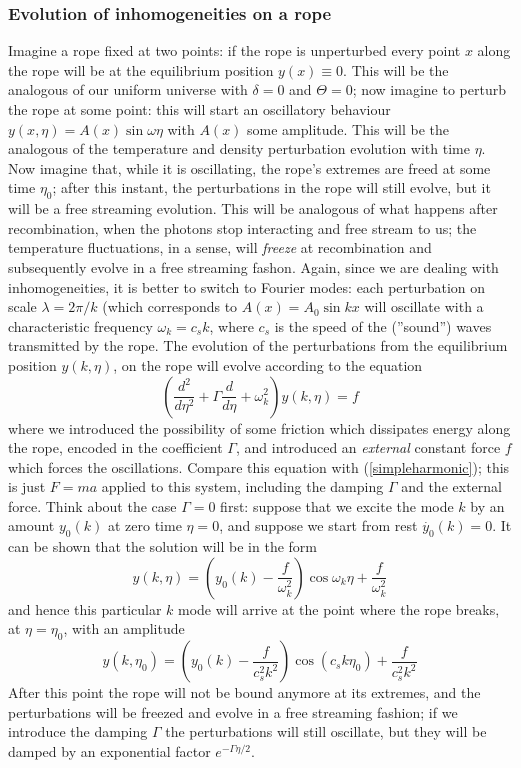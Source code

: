 \subsubsection{Evolution of inhomogeneities on a rope}
Imagine a rope fixed at two points: if the rope is unperturbed every point $x$ along the rope will be at the equilibrium position $y(x)\equiv0$. This will be the analogous of our uniform universe with $\delta=0$ and $\Theta=0$; now imagine to perturb the rope at some point: this will start an oscillatory behaviour $y(x,\eta)=A(x)\sin{\omega \eta}$ with $A(x)$ some amplitude. This will be the analogous of the temperature and density perturbation evolution with time $\eta$. Now imagine that, while it is oscillating, the rope's extremes are freed at some time $\eta_0$; after this instant, the perturbations in the rope will still evolve, but it will be a free streaming evolution. This will be analogous of what happens after recombination, when the photons stop interacting and free stream to us; the temperature fluctuations, in a sense, will \textit{freeze} at recombination and subsequently evolve in a free streaming fashon. Again, since we are dealing with inhomogeneities, it is better to switch to Fourier modes:
 each perturbation on scale $\lambda=2\pi/k$ (which corresponds to $A(x)=A_0\sin{kx}$ will oscillate with a characteristic frequency $\omega_k=c_s k$, where $c_s$ is the speed of the (''sound'') waves transmitted by the rope. The evolution of the perturbations from the equilibrium position $y(k,\eta)$, on the rope will evolve according to the equation
\begin{equation}
\label{ropewaveeq}
\left(\frac{d^2}{d\eta^2}+\Gamma \frac{d}{d\eta}+\omega_k^2\right)y(k,\eta)=f
\end{equation}
where we introduced the possibility of some friction which dissipates energy along the rope, encoded in the coefficient $\Gamma$, and introduced an \textit{external} constant force $f$ which forces the oscillations. Compare this equation with (\ref{simpleharmonic}); this is just $F=ma$ applied to this system, including the damping $\Gamma$ and the external force. Think about the case $\Gamma=0$ first: suppose that we excite the mode $k$ by an amount $y_0(k)$ at zero time $\eta=0$, and suppose we start from rest $\dot{y_0}(k)=0$. It can be shown that the solution will be in the form 
\begin{equation}
y(k,\eta)=\left(y_0(k)-\frac{f}{\omega_k^2}\right)\cos{\omega_k\eta}+\frac{f}{\omega_k^2}
\end{equation}
and hence this particular $k$ mode will arrive at the point where the rope breaks, at $\eta=\eta_0$, with an amplitude
\begin{equation}
\label{pertfreeze}
y(k,\eta_0)=\left(y_0(k)-\frac{f}{c_s^2k^2}\right)\cos{(c_sk\eta_0)}+\frac{f}{c_s^2k^2}
\end{equation}
After this point the rope will not be bound anymore at its extremes, and the perturbations will be freezed and evolve in a free streaming fashion; if we introduce the damping $\Gamma$ the perturbations will still oscillate, but they will be damped by an exponential factor $e^{-\Gamma \eta/2}$. 

